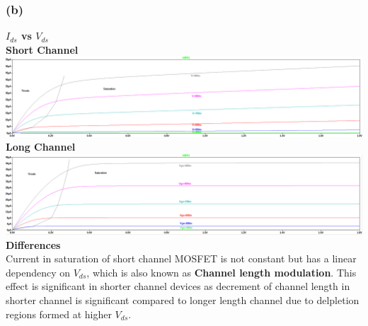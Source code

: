 \documentclass{article}
\begin{document}
\subsubsection*{(b)}
\textbf{$I_{ds}$ vs $V_{ds}$}\\
 \newline
\textbf{Short Channel}\\
\includegraphics[scale=0.28]{./figs/Q4_b_nmos_sc.png}\\
 \newline
\textbf{Long Channel}\\
\includegraphics[scale=0.28]{./figs/Q4_b_nmos_lc.png}\\
 \newline
\textbf{Differences}\\
Current in saturation of short channel MOSFET is not constant but has a linear dependency on $V_{ds}$, which is also known as \textbf{Channel length modulation}. This effect is significant in shorter channel devices as decrement of channel length in shorter channel is significant compared to longer length channel due to delpletion regions formed at higher $V_{ds}$. 
\end{document}
